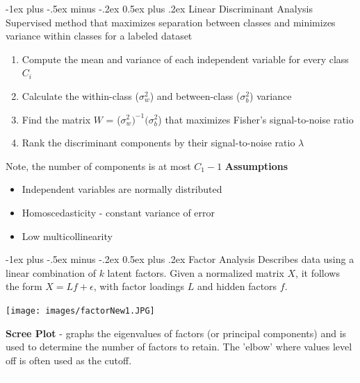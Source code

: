 \documentclass[10pt,landscape]{article}
\makeatletter
\renewcommand{\subsection}{\@startsection{subsection}{2}{0mm}%
                                {-1ex plus -.5ex minus -.2ex}%
                                {0.5ex plus .2ex}%
                                {\normalfont\normalsize\bfseries}}
\makeatother
\begin{document}
\begin{multicols}{3}
\subsection{Linear Discriminant Analysis}
Supervised method that maximizes separation between classes and minimizes variance within classes for a labeled dataset
\begin{enumerate}[leftmargin=5mm]
\itemsep -.4mm
\item Compute the mean and variance of each independent variable for every class $C_i$
\item Calculate the within-class ($\sigma_w^2$) and between-class ($\sigma_b^2$) variance
\item Find the matrix $W$ = ($\sigma_w^2)^{-1}(\sigma_b^2$) that maximizes Fisher's signal-to-noise ratio
\item Rank the discriminant components by their signal-to-noise ratio $\lambda$
\end{enumerate}
Note, the number of components is at most $C_1 - 1$
\textbf{Assumptions}
\vspace{-.7mm}
\begin{itemize}[label={--},leftmargin=4mm]
\itemsep -.4mm
\item Independent variables are normally distributed
\item Homoscedasticity - constant variance of error
\item Low multicollinearity
\end{itemize}


\subsection{Factor Analysis}
Describes data using a linear combination of $k$ latent factors.
Given a normalized matrix $X$, it follows the form  $X = Lf + \epsilon$,  with factor loadings $L$ and hidden factors $f$.
\vspace{-1mm}
\begin{center}
    \texttt{[image: images/factorNew1.JPG]}
\end{center}
\vspace{-2mm}

\smallskip
\textbf{Scree Plot} - graphs the eigenvalues of factors (or principal components) and is used to determine the number of factors to retain. The 'elbow' where values level off is often used as the cutoff.
\columnbreak
\\\textcolor{white}{.}\vspace{-5mm}\\ %

\end{multicols}
\end{document}
